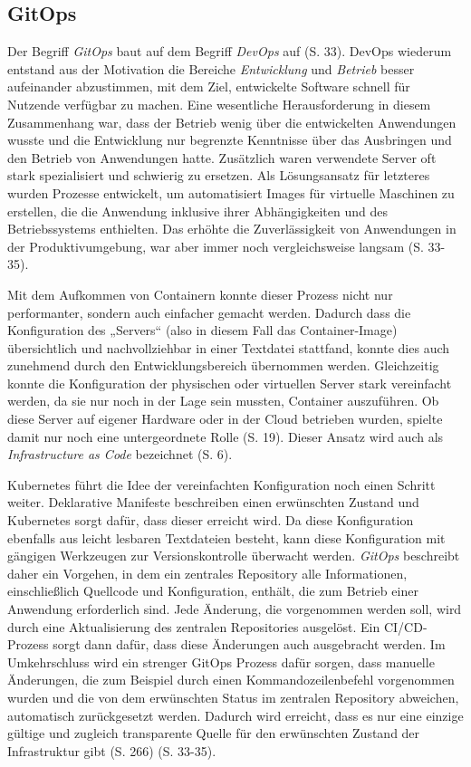 \documentclass[11pt,a4paper]{article}
\begin{document}
\subsection{GitOps}
Der Begriff \emph{GitOps} baut auf dem Begriff \emph{DevOps} auf \cite{cicd_with_kubernetes_devops} (S. 33).
DevOps wiederum entstand aus der Motivation die Bereiche \emph{Entwicklung} und \emph{Betrieb}
besser aufeinander abzustimmen, mit dem Ziel, entwickelte Software schnell
für Nutzende verfügbar zu machen. Eine wesentliche Herausforderung in diesem Zusammenhang
war, dass der Betrieb wenig über die entwickelten Anwendungen wusste und
die Entwicklung nur begrenzte Kenntnisse über das Ausbringen und den Betrieb von Anwendungen hatte.
Zusätzlich waren verwendete Server oft stark spezialisiert und schwierig zu ersetzen.
Als Lösungsansatz für letzteres wurden Prozesse entwickelt, um automatisiert Images
für virtuelle Maschinen zu erstellen, die die Anwendung inklusive ihrer Abhängigkeiten
und des Betriebssystems enthielten. Das erhöhte die Zuverlässigkeit von
Anwendungen in der Produktivumgebung, war aber immer noch vergleichsweise langsam \cite{cicd_with_kubernetes_devops} (S. 33-35).

Mit dem Aufkommen von Containern konnte dieser Prozess nicht nur performanter, sondern
auch einfacher gemacht werden. Dadurch dass die Konfiguration des „Servers“ (also in diesem
Fall das Container-Image) übersichtlich und nachvollziehbar in einer Textdatei stattfand,
konnte dies auch zunehmend durch den Entwicklungsbereich übernommen werden.
Gleichzeitig konnte die Konfiguration der physischen oder virtuellen Server
stark vereinfacht werden, da sie nur noch in der Lage sein mussten, Container auszuführen.
Ob diese Server auf eigener Hardware oder in der Cloud betrieben wurden, spielte damit nur
noch eine untergeordnete Rolle \cite{cicd_with_kubernetes_devops} (S. 19).
Dieser Ansatz wird auch als \emph{Infrastructure as Code} bezeichnet \cite{domingus2022cloud} (S. 6).

Kubernetes führt die Idee der vereinfachten Konfiguration noch einen Schritt weiter.
Deklarative Manifeste beschreiben einen erwünschten Zustand
und Kubernetes sorgt dafür, dass dieser erreicht wird.
Da diese Konfiguration ebenfalls aus leicht lesbaren Textdateien besteht,
kann diese Konfiguration mit gängigen Werkzeugen zur Versionskontrolle
überwacht werden. \emph{GitOps} beschreibt daher ein Vorgehen,
in dem ein zentrales Repository alle Informationen, einschließlich Quellcode und Konfiguration,
enthält, die zum Betrieb einer Anwendung erforderlich sind.
Jede Änderung, die vorgenommen werden soll, wird durch eine Aktualisierung
des zentralen Repositories ausgelöst. Ein CI/CD-Prozess sorgt dann dafür,
dass diese Änderungen auch ausgebracht werden.
Im Umkehrschluss wird ein strenger GitOps Prozess dafür sorgen,
dass manuelle Änderungen, die zum Beispiel durch einen Kommandozeilenbefehl
vorgenommen wurden und die von dem erwünschten Status im zentralen Repository
abweichen, automatisch zurückgesetzt werden.
Dadurch wird erreicht, dass es nur eine einzige gültige und zugleich transparente
Quelle für den erwünschten Zustand der Infrastruktur gibt \cite{domingus2022cloud} (S. 266) \cite{cicd_with_kubernetes_devops} (S. 33-35).
\end{document}
